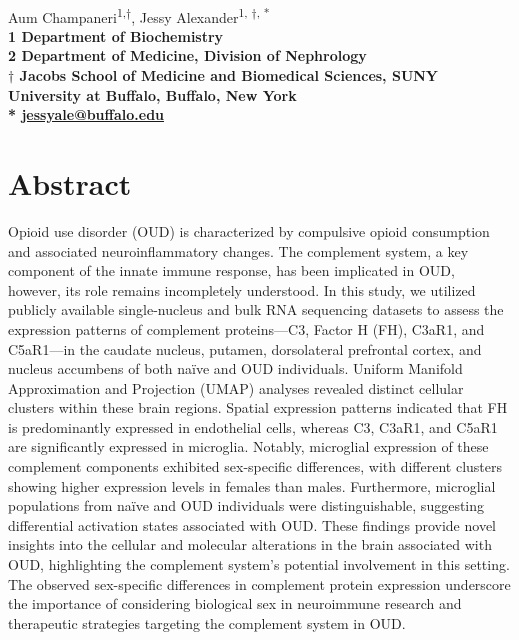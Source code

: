 \documentclass[10pt,letterpaper]{article}
\begin{document}
\vspace*{0.35in}

\begin{flushleft}
{\Large
\textbf{}
}
\newline
\\
Aum Champaneri\textsuperscript{1,$\dagger$},
Jessy Alexander\textsuperscript{1, $\dagger$, *}
\\
\bigskip
\bf{1} Department of Biochemistry
\\
\bf{2} Department of Medicine, Division of Nephrology
\\
\bf{$\dagger$} Jacobs School of Medicine and Biomedical Sciences, SUNY University at Buffalo, Buffalo, New York
\bigskip
\\
* \href{mailto:jessyale@buffalo.edu}{jessyale@buffalo.edu}

\end{flushleft}

\section*{Abstract}
Opioid use disorder (OUD) is characterized by compulsive opioid consumption and associated neuroinflammatory changes. The complement system, a key component of the innate immune response, has been implicated in OUD, however, its role remains incompletely understood. In this study, we utilized publicly available single-nucleus and bulk RNA sequencing datasets to assess the expression patterns of complement proteins—C3, Factor H (FH), C3aR1, and C5aR1—in the caudate nucleus, putamen, dorsolateral prefrontal cortex, and nucleus accumbens of both naïve and OUD individuals. Uniform Manifold Approximation and Projection (UMAP) analyses revealed distinct cellular clusters within these brain regions. Spatial expression patterns indicated that FH is predominantly expressed in endothelial cells, whereas C3, C3aR1, and C5aR1 are significantly expressed in microglia. Notably, microglial expression of these complement components exhibited sex-specific differences, with different clusters showing higher expression levels in females than males. Furthermore, microglial populations from naïve and OUD individuals were distinguishable, suggesting differential activation states associated with OUD. These findings provide novel insights into the cellular and molecular alterations in the brain associated with OUD, highlighting the complement system's potential involvement in this setting. The observed sex-specific differences in complement protein expression underscore the importance of considering biological sex in neuroimmune research and therapeutic strategies targeting the complement system in OUD.
\end{document}
